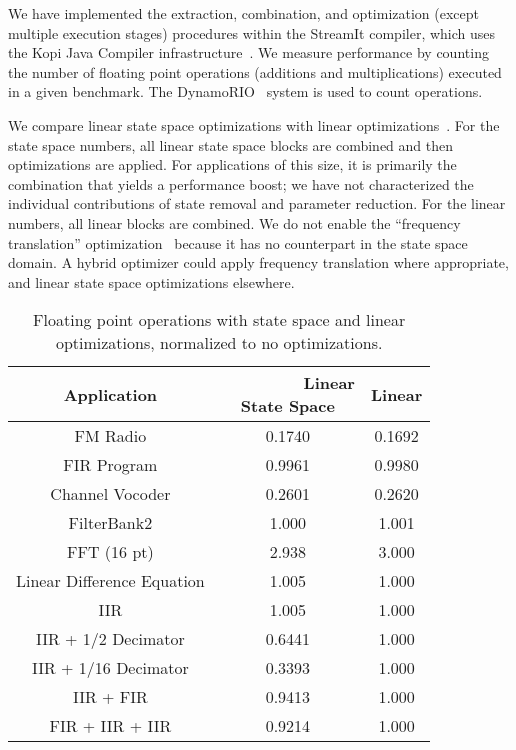 \label{sec:results}

We have implemented the extraction, combination, and optimization
(except multiple execution stages) procedures within the StreamIt
compiler, which uses the Kopi Java Compiler
infrastructure~\cite{kopi}. We measure performance by counting the
number of floating point operations (additions and multiplications)
executed in a given benchmark. The DynamoRIO~\cite{dynamo} system is
used to count operations.

We compare linear state space optimizations with linear
optimizations~\cite{Lamb}.  For the state space numbers, all linear
state space blocks are combined and then optimizations are applied.
For applications of this size, it is primarily the combination that
yields a performance boost; we have not characterized the individual
contributions of state removal and parameter reduction.  For the
linear numbers, all linear blocks are combined.  We do not enable the
``frequency translation'' optimization~\cite{Lamb} because it has no
counterpart in the state space domain.  A hybrid optimizer could apply
frequency translation where appropriate, and linear state space
optimizations elsewhere.

\begin{table}[tbp]
\small
\begin{center}
\begin{tabular} {c|c|c}
{\bf Application} & \hspace{-8pt}~~~~~~\parbox{0.7in}{{\bf ~~~Linear} \\ {\bf State Space} \vspace{2pt}}\hspace{-8pt} & {\bf Linear} \\ \hline
FM Radio & 0.1740 & 0.1692 \\
FIR Program &  0.9961 & 0.9980 \\
Channel Vocoder & 0.2601 & 0.2620 \\
FilterBank2 & 1.000 & 1.001 \\
FFT (16 pt) & 2.938 & 3.000 \\
Linear Difference Equation & 1.005 & 1.000 \\
IIR & 1.005 & 1.000 \\
IIR + 1/2 Decimator & 0.6441 & 1.000 \\
IIR + 1/16 Decimator & 0.3393 & 1.000 \\
IIR + FIR & 0.9413 & 1.000 \\
FIR + IIR + IIR & 0.9214 & 1.000
\end{tabular}
\caption{Floating point operations with state space and linear
optimizations, normalized to no optimizations.\protect\label{tab:results}}
\end{center}
\vspace{-18pt}
\end{table}

